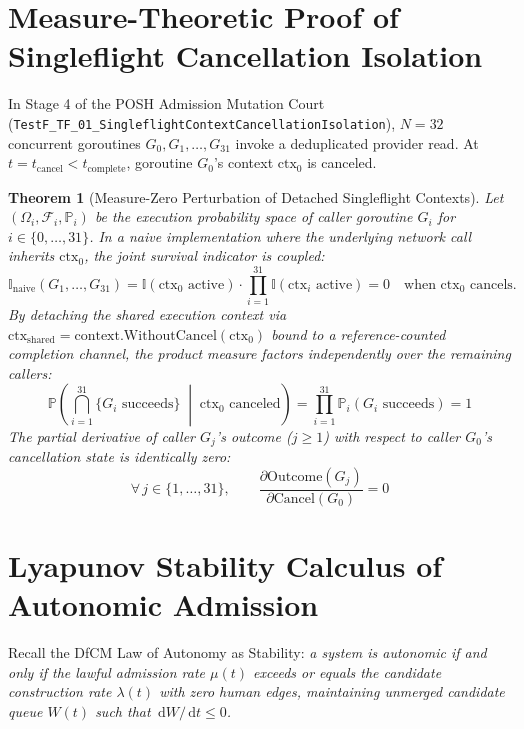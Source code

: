 \documentclass[10pt,twoside,openany]{book}
\theoremstyle{plain}
\newtheorem{theorem}{Theorem}[chapter]
\theoremstyle{definition}
\theoremstyle{remark}
\newcommand{\Prob}{\mathbb{P}}
\newcommand{\dd}{\,\mathrm{d}}
\begin{document}
\section{Measure-Theoretic Proof of Singleflight Cancellation Isolation}
In Stage 4 of the POSH Admission Mutation Court (\texttt{TestF\_TF\_01\_SingleflightContextCancellationIsolation}), $N = 32$ concurrent goroutines $G_0, G_1, \dots, G_{31}$ invoke a deduplicated provider read. At $t = t_{\mathrm{cancel}} < t_{\mathrm{complete}}$, goroutine $G_0$'s context $\mathrm{ctx}_0$ is canceled.

\begin{theorem}[Measure-Zero Perturbation of Detached Singleflight Contexts]
Let $(\Omega_i, \mathcal{F}_i, \Prob_i)$ be the execution probability space of caller goroutine $G_i$ for $i \in \{0, \dots, 31\}$. In a naive implementation where the underlying network call inherits $\mathrm{ctx}_0$, the joint survival indicator is coupled:
\begin{equation}
\mathbb{I}_{\mathrm{naive}}(G_1, \dots, G_{31}) = \mathbb{I}(\mathrm{ctx}_0 \text{ active}) \cdot \prod_{i=1}^{31} \mathbb{I}(\mathrm{ctx}_i \text{ active}) = 0 \quad \text{when } \mathrm{ctx}_0 \text{ cancels.}
\end{equation}
By detaching the shared execution context via $\mathrm{ctx}_{\mathrm{shared}} = \mathrm{context.WithoutCancel}(\mathrm{ctx}_0)$ bound to a reference-counted completion channel, the product measure factors independently over the remaining callers:
\begin{equation}
\Prob\!\left( \bigcap_{i=1}^{31} \{ G_i \text{ succeeds} \} \;\middle|\; \mathrm{ctx}_0 \text{ canceled} \right) = \prod_{i=1}^{31} \Prob_i(G_i \text{ succeeds}) = 1
\end{equation}
The partial derivative of caller $G_j$'s outcome ($j \ge 1$) with respect to caller $G_0$'s cancellation state is identically zero:
\begin{equation}
\forall\, j \in \{1, \dots, 31\},\qquad \frac{\partial \mathrm{Outcome}(G_j)}{\partial \mathrm{Cancel}(G_0)} = 0
\end{equation}
\end{theorem}

\section{Lyapunov Stability Calculus of Autonomic Admission}
Recall the DfCM Law of Autonomy as Stability: \emph{a system is autonomic if and only if the lawful admission rate $\mu(t)$ exceeds or equals the candidate construction rate $\lambda(t)$ with zero human edges, maintaining unmerged candidate queue $W(t)$ such that $\dd W/\dd t \le 0$.}
\end{document}
